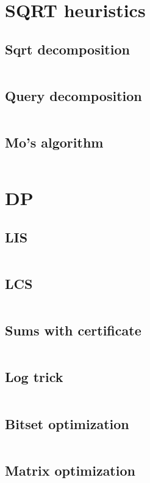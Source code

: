 ﻿\documentclass[10pt,twocolumn,oneside]{article}
\begin{document}
\section{SQRT heuristics}
\subsection{Sqrt decomposition}
\inputminted[breaklines]{python}{SQRT heuristics/sqrt decomposition.py}
\subsection{Query decomposition}
\inputminted[breaklines]{cpp}{SQRT heuristics/query decomposition.cpp}
\subsection{Mo's algorithm}
\inputminted[breaklines]{cpp}{SQRT heuristics/mo's algorithm.cpp}

\section{DP}
\subsection{LIS}
\inputminted[breaklines]{cpp}{DP/lis.cpp}
\subsection{LCS}
\inputminted[breaklines]{python}{DP/lcs.py}
\subsection{Sums with certificate}
\inputminted[breaklines]{python}{DP/sums with certificate.py}
\subsection{Log trick}
\inputminted[breaklines]{cpp}{DP/log-trick.cpp}
\subsection{Bitset optimization}
\inputminted[breaklines]{cpp}{DP/bitset optimization.cpp}
\subsection{Matrix optimization}
\inputminted[breaklines]{cpp}{DP/matrix optimization.cpp}
\end{document}
